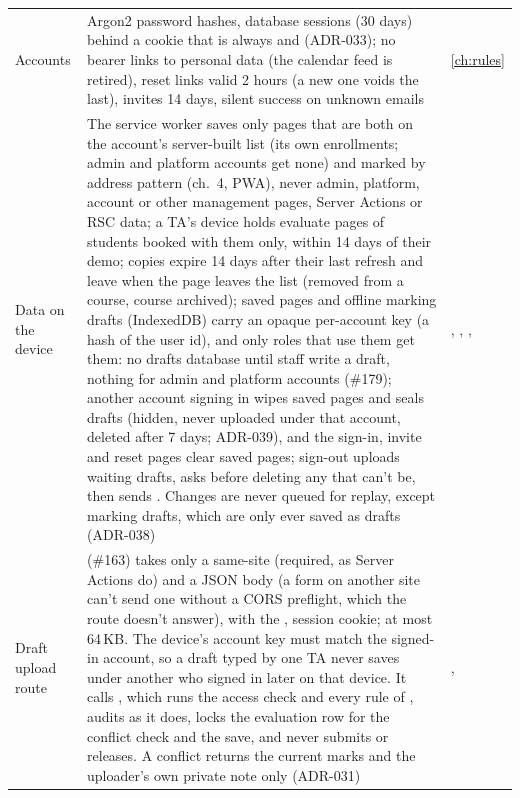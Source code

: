\begin{xltabular}{\linewidth}{@{}P{30mm} L P{26mm}@{}}
  Accounts & Argon2 password hashes, database sessions (30 days) behind a  cookie that is always  and  (ADR-033); no bearer links to personal data (the calendar feed is retired), reset links valid 2 hours (a new one voids the last), invites 14 days, silent success on unknown emails & \cref{ch:rules}\\
  Data on the device & The service worker saves only pages that are both on the account's server-built list (its own enrollments; admin and platform accounts get none) and marked  by address pattern (ch.~4, PWA), never admin, platform, account or other management pages, Server Actions or RSC data; a TA's device holds evaluate pages of students booked with them only, within 14 days of their demo; copies expire 14 days after their last refresh and leave when the page leaves the list (removed from a course, course archived); saved pages and offline marking drafts (IndexedDB) carry an opaque per-account key (a hash of the user id), and only roles that use them get them: no drafts database until staff write a draft, nothing for admin and platform accounts (\#179); another account signing in wipes saved pages and seals drafts (hidden, never uploaded under that account, deleted after 7 days; ADR-039), and the sign-in, invite and reset pages clear saved pages; sign-out uploads waiting drafts, asks before deleting any that can't be, then sends . Changes are never queued for replay, except marking drafts, which are only ever saved as drafts (ADR-038) & , , , \\
  Draft upload route &  (\#163) takes only a same-site  (required, as Server Actions do) and a JSON body (a form on another site can't send one without a CORS preflight, which the route doesn't answer), with the ,  session cookie; at most 64\,KB. The device's account key must match the signed-in account, so a draft typed by one TA never saves under another who signed in later on that device. It calls , which runs the access check and every rule of , audits as it does, locks the evaluation row for the conflict check and the save, and never submits or releases. A conflict returns the current marks and the uploader's own private note only (ADR-031) & , \\

\end{xltabular}
